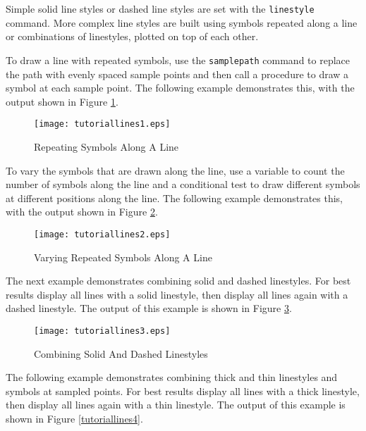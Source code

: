 Simple solid line styles or dashed line styles
are set with the
\texttt{linestyle} command.  More complex line styles are built using
symbols repeated along a line or combinations of linestyles, plotted
on top of each other.

To draw a line with repeated symbols, use the
\texttt{samplepath}
command to replace the path with evenly spaced sample points and
then call a procedure to draw a symbol at each sample point.
The following example demonstrates this,
with the output shown in Figure \ref{tutoriallines1}.



\begin{figure}[htb]
\texttt{[image: tutoriallines1.eps]}
\caption{Repeating Symbols Along A Line}
\label{tutoriallines1}
\end{figure}

To vary the symbols that are drawn along the line, use a variable
to count the number of symbols along the line and a conditional
test to draw different symbols at different positions along the line.
The following example demonstrates this,
with the output shown in Figure \ref{tutoriallines2}.



\begin{figure}[htb]
\texttt{[image: tutoriallines2.eps]}
\caption{Varying Repeated Symbols Along A Line}
\label{tutoriallines2}
\end{figure}

The next example demonstrates
combining solid and dashed linestyles.
For best results display all lines with a solid linestyle,
then display all lines again with a dashed linestyle.
The output of this example is shown in Figure \ref{tutoriallines3}.



\begin{figure}[htb]
\texttt{[image: tutoriallines3.eps]}
\caption{Combining Solid And Dashed Linestyles}
\label{tutoriallines3}
\end{figure}

The following example demonstrates combining thick and
thin linestyles and symbols at sampled points.
For best results display all lines with a thick linestyle,
then display all lines again with a thin linestyle.
The output of this example is shown in Figure \ref{tutoriallines4}.



